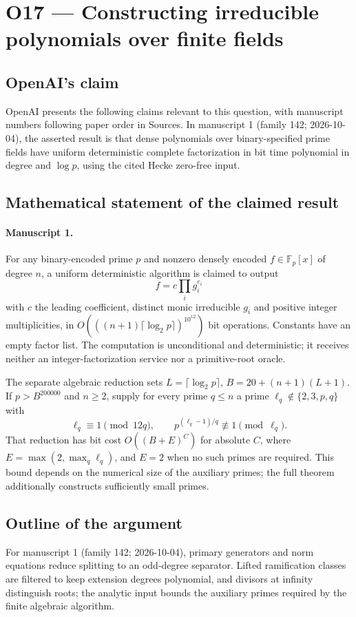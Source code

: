 \documentclass[11pt]{article}
\begin{document}
\section*{O17 — Constructing irreducible polynomials over finite fields}

\subsection{OpenAI's claim}
OpenAI presents the following claims relevant to this question, with manuscript numbers following paper order in Sources. In manuscript 1 (family 142; 2026-10-04), the asserted result is that dense polynomials over binary-specified prime fields have uniform deterministic complete factorization in bit time polynomial in degree and $\log p$, using the cited Hecke zero-free input.

\subsection{Mathematical statement of the claimed result}
\paragraph{Manuscript 1.}
For any binary-encoded prime $p$ and nonzero densely encoded $f\in\mathbb F_p[x]$ of degree $n$, a uniform deterministic algorithm is claimed to output
\[
 f=c\prod_i g_i^{e_i}
\]
with $c$ the leading coefficient, distinct monic irreducible $g_i$ and positive integer multiplicities, in $O(((n+1)\lceil\log_2p\rceil)^{10^{12}})$ bit operations. Constants have an empty factor list. The computation is unconditional and deterministic; it receives neither an integer-factorization service nor a primitive-root oracle.

The separate algebraic reduction sets $L=\lceil\log_2p\rceil$, $B=20+(n+1)(L+1)$. If $p>B^{200000}$ and $n\ge2$, supply for every prime $q\le n$ a prime $\ell_q\notin\{2,3,p,q\}$ with
\[
 \ell_q\equiv1\pmod{12q},\qquad p^{(\ell_q-1)/q}\not\equiv1\pmod{\ell_q}.
\]
That reduction has bit cost $O((B+E)^C)$ for absolute $C$, where $E=\max(2,\max_q\ell_q)$, and $E=2$ when no such primes are required. This bound depends on the numerical size of the auxiliary primes; the full theorem additionally constructs sufficiently small primes.

\subsection{Outline of the argument}
For manuscript 1 (family 142; 2026-10-04), primary generators and norm equations reduce splitting to an odd-degree separator. Lifted ramification classes are filtered to keep extension degrees polynomial, and divisors at infinity distinguish roots; the analytic input bounds the auxiliary primes required by the finite algebraic algorithm.
\end{document}
